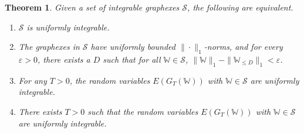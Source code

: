 \documentclass{amsart}
\numberwithin{equation}{section}
\numberwithin{figure}{section}
\newtheorem{theorem}{Theorem}[section]
\theoremstyle{definition}
\theoremstyle{remark}
\newcommand{\eps}{\varepsilon}
\newcommand{\cW}{\mathbb{W}}
\newcommand{\cS}{\mathcal{S}}
\begin{document}
\begin{theorem} \label{thmunifintegequiv}
Given a set of integrable graphexes $\mathcal{S}$, the following are
equivalent.
\begin{enumerate}
\item $\cS$ is uniformly integrable. \label{conditionunifintegD}
 \item The graphexes in $\cS$ have uniformly bounded $\|\cdot\|_1$-norms,
     and for every $\eps>0$, there exists a $D$ such that for all $\cW
\in\mathcal{S}$, $\|\cW\|_1 - \|\cW_{\le D}\|_1<\varepsilon$.
\label{conditionunifintegW}
\item For any $T>0$, the random variables $E(G_T(\cW))$ with $\cW \in \cS$
    are uniformly integrable. \label{conditionunifintegallT}
\item There exists $T>0$ such that the random variables $E(G_T(\cW))$ with
    $\cW \in \cS$ are uniformly integrable. \label{conditionunifintegsomeT}
\end{enumerate}
\end{theorem}
\end{document}
